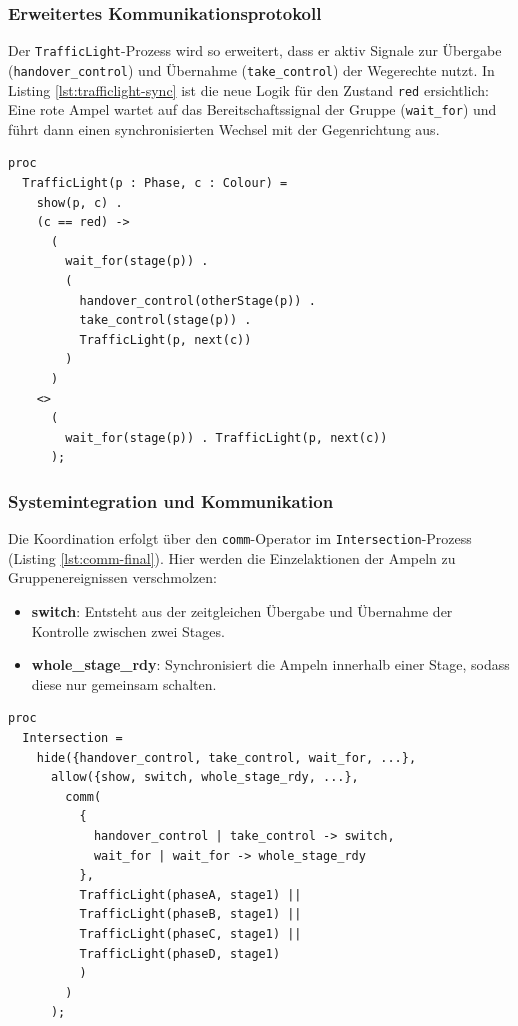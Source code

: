 \documentclass{article}
\begin{document}
\subsubsection{Erweitertes Kommunikationsprotokoll}
Der \texttt{TrafficLight}-Prozess wird so erweitert, dass er aktiv Signale zur Übergabe (\texttt{handover\_control}) und Übernahme (\texttt{take\_control}) der Wegerechte nutzt. 
In Listing \ref{lst:trafficlight-sync} ist die neue Logik für den Zustand \texttt{red} ersichtlich: Eine rote Ampel wartet auf das Bereitschaftssignal der Gruppe (\texttt{wait\_for}) und führt dann einen synchronisierten Wechsel mit der Gegenrichtung aus.

\begin{lstlisting}[caption={Synchronisierter Ampel-Zyklus}, label={lst:trafficlight-sync}]
proc
  TrafficLight(p : Phase, c : Colour) =
    show(p, c) .
    (c == red) ->
      (
        wait_for(stage(p)) .
        (
          handover_control(otherStage(p)) .
          take_control(stage(p)) .
          TrafficLight(p, next(c))
        )
      )
    <>
      (
        wait_for(stage(p)) . TrafficLight(p, next(c))
      );
\end{lstlisting}


\subsubsection{Systemintegration und Kommunikation}
Die Koordination erfolgt über den \texttt{comm}-Operator im \texttt{Intersection}-Prozess (Listing \ref{lst:comm-final}). Hier werden die Einzelaktionen der Ampeln zu Gruppenereignissen verschmolzen:
\begin{itemize}
\item \textbf{switch}: Entsteht aus der zeitgleichen Übergabe und Übernahme der Kontrolle zwischen zwei Stages.
\item \textbf{whole\_stage\_rdy}: Synchronisiert die Ampeln innerhalb einer Stage, sodass diese nur gemeinsam schalten.
\end{itemize}  

\begin{lstlisting}[caption={Dezentrale Synchronisation im Intersection-Prozess}, label={lst:comm-final}]
proc
  Intersection =
    hide({handover_control, take_control, wait_for, ...},
      allow({show, switch, whole_stage_rdy, ...},
        comm(
          {
          	handover_control | take_control -> switch,
          	wait_for | wait_for -> whole_stage_rdy
          },
          TrafficLight(phaseA, stage1) ||
          TrafficLight(phaseB, stage1) ||
          TrafficLight(phaseC, stage1) ||
          TrafficLight(phaseD, stage1)
          )
        )
      );
\end{lstlisting}
\end{document}
